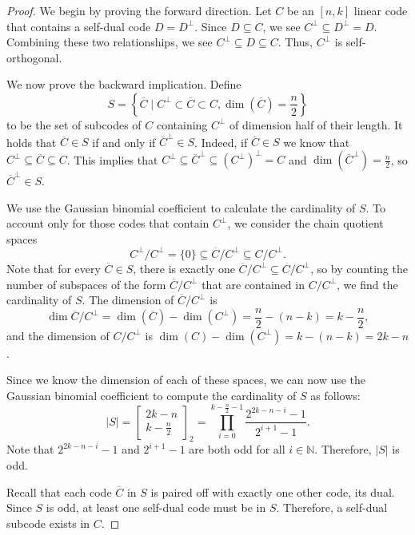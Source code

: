 \documentclass{amsart}
\theoremstyle{definition}
\begin{document}
\begin{proof}
  We begin by proving the forward direction. Let $C$ be an $[n,k]$ linear code that contains a self-dual code $D=D^\perp$. Since $D\subseteq C$, we see $C^\perp\subseteq D^\perp=D$. Combining these two relationships, we see $C^\perp\subseteq D\subseteq C$. Thus, $C^\perp$ is self-orthogonal.
  


We now prove the backward implication. Define \[S=\left\{\overline{C}\mid  C^\perp\subset \overline{C}\subset C, \dim(\overline{C})=\frac{n}{2}\right\}\] to be the set of subcodes of $C$ containing $C^\perp$ of dimension half of their length. 
It holds that $\overline{C}\in S$ if and only if $\overline{C}^\perp\in S$. Indeed, if $\overline{C}\in S$ we know that  $C^\perp\subseteq\overline{C}\subseteq C$. This implies that $C^\perp\subseteq\overline{C}^\perp\subseteq (C^\perp)^\perp=C$ and $\dim(\overline{C}^\perp)=\frac{n}{2}$, so $\overline{C}^\perp\in S$. 

 We use the Gaussian binomial coefficient to calculate the cardinality of $S$. To account only for those codes that contain $C^\perp$, we consider the chain quotient spaces 
 \[C^\perp/C^\perp=\{0\}\subseteq\overline{C}/C^\perp\subseteq C/C^\perp.\] Note that for every $\overline{C}\in S$, there is exactly one $\overline{C}/C^\perp\subseteq C/C^\perp$, so by counting the number of subspaces of the form $\overline{C}/C^\perp$ that are contained in $C/C^\perp$, we find the cardinality of $S$. The dimension of $\overline{C}/C^\perp$ is \[\dim \overline{C}/C^\perp=\dim(\overline{C})-\dim(C^\perp)=\frac{n}{2}-(n-k)=k-\frac{n}{2},\] and the dimension of $C/C^\perp$ is $\dim(C)-\dim(C^\perp)=k-(n-k)=2k-n$. 
 
 Since we know the dimension of each of these spaces, we can now use the Gaussian binomial coefficient to compute the cardinality of $S$ as follows:
\[
|S| = \left[\begin{smallmatrix} 2k-n \\ k-\frac{n}{2} \end{smallmatrix}\right]_2=\prod_{i=0}^{k-\frac{n}{2}-1}\frac{2^{2k-n-i}-1}{2^{i+1}-1}.
\]
Note that $2^{2k-n-i}-1$ and $2^{i+1}-1$ are both odd for all $i\in\mathbb{N}$. Therefore, $|S|$ is odd. 

Recall that each code $\overline{C}$ in $S$ is paired off with exactly one other code, its dual. Since $S$ is odd, at least one self-dual code must be in $S$. Therefore, a self-dual subcode exists in $C$.
\end{proof}
\end{document}
